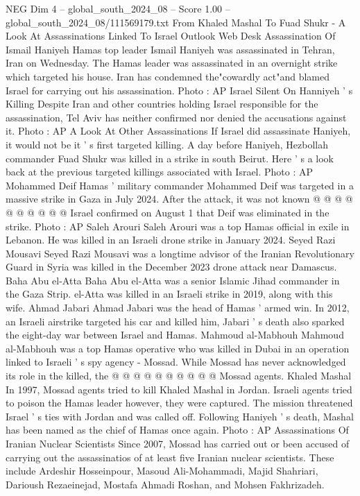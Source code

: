 \begin{textsample}{NEG Dim 4 – global\_south\_2024\_08 – Score 1.00 – global\_south\_2024\_08/111569179.txt}  \label{ex:f4_neg_333}
From Khaled Mashal To Fuad Shukr - A Look At Assassinations Linked To Israel Outlook Web Desk Assassination Of Ismail Haniyeh Hamas top leader Ismail Haniyeh was assassinated in Tehran, Iran on Wednesday.
The Hamas leader was assassinated in an overnight strike which targeted his house.
Iran has condemned the"cowardly act"and blamed Israel for carrying out his assassination.
Photo : AP Israel Silent On Hanniyeh ' s Killing Despite Iran and other countries holding Israel responsible for the assassination, Tel Aviv has neither confirmed nor denied the accusations against it.
Photo : AP A Look At Other Assassinations If Israel did assassinate Haniyeh, it would not be it ' s first targeted killing.
A day before Haniyeh, Hezbollah commander Fuad Shukr was killed in a strike in south Beirut.
Here ' s a look back at the previous targeted killings associated with Israel.
Photo : AP Mohammed Deif Hamas ' military commander Mohammed Deif was targeted in a massive strike in Gaza in July 2024.
After the attack, it was not known @ @ @ @ @ @ @ @ @ @ Israel confirmed on August 1 that Deif was eliminated in the strike.
Photo : AP Saleh Arouri Saleh Arouri was a top Hamas official in exile in Lebanon.
He was killed in an Israeli drone strike in January 2024.
Seyed Razi Mousavi Seyed Razi Mousavi was a longtime advisor of the Iranian Revolutionary Guard in Syria was killed in the December 2023 drone attack near Damascus.
Baha Abu el-Atta Baha Abu el-Atta was a senior Islamic Jihad commander in the Gaza Strip. el-Atta was killed in an Israeli strike in 2019, along with this wife.
Ahmad Jabari Ahmad Jabari was the head of Hamas ' armed win.
In 2012, an Israeli airstrike targeted his car and killed him, Jabari ' s death also sparked the eight-day war between Israel and Hamas.
Mahmoud al-Mabhouh Mahmoud al-Mabhouh was a top Hamas operative who was killed in Dubai in an operation linked to Israeli ' s spy agency - Mossad.
While Mossad has never acknowledged its role in the killed, the @ @ @ @ @ @ @ @ @ @ Mossad agents.
Khaled Mashal In 1997, Mossad agents tried to kill Khaled Mashal in Jordan.
Israeli agents tried to poison the Hamas leader however, they were captured.
The mission threatened Israel ' s ties with Jordan and was called off.
Following Haniyeh ' s death, Mashal has been named as the chief of Hamas once again.
Photo : AP Assassinations Of Iranian Nuclear Scientists Since 2007, Mossad has carried out or been accused of carrying out the assassinatios of at least five Iranian nuclear scientists.
These include Ardeshir Hosseinpour, Masoud Ali-Mohammadi, Majid Shahriari, Darioush Rezaeinejad, Mostafa Ahmadi Roshan, and Mohsen Fakhrizadeh.

\end{textsample}
